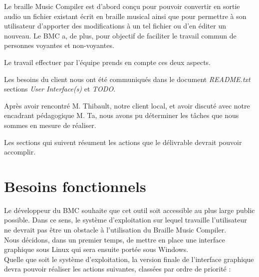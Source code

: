 
Le braille Music Compiler est d'abord conçu pour pouvoir convertir en sortie audio un fichier existant écrit en braille musical ainsi que pour permettre à son utilisateur d'apporter des modifications à un tel fichier ou d'en éditer un nouveau. Le BMC a, de plus, pour objectif de faciliter le travail commun de personnes voyantes et non-voyantes.

Le travail effectuer par l'équipe prends en compte ces deux aspects.

Les besoins du client nous ont été communiqués dans le document \textit{README.txt} sections \textit{User Interface(s)} et \textit{TODO}.

Après avoir rencontré M. Thibault, notre client local, et avoir discuté avec notre encadrant pédagogique M. Ta, nous avons pu déterminer les tâches que nous sommes en mesure de réaliser. 

Les sections qui suivent résument les actions que le délivrable devrait pouvoir accomplir.


\section{Besoins fonctionnels}
Le développeur du BMC souhaite que cet outil soit accessible au plus large public possible. Dans ce sens, le système d'exploitation sur lequel travaille l'utilisateur ne devrait pas être un obstacle à l'utilisation du Braille Music Compiler.\\

Nous décidons, dans un premier temps, de mettre en place une interface graphique sous Linux qui sera ensuite portée sous Windows.\\
 
Quelle que soit le système d'exploitation, la version finale de l'interface graphique devra pouvoir réaliser les actions suivantes, classées par ordre de priorité : \\

